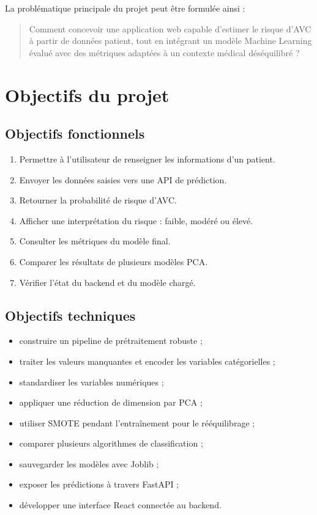 \documentclass[12pt,a4paper]{report}
\begin{document}
La problématique principale du projet peut être formulée ainsi :

\begin{quote}
Comment concevoir une application web capable d'estimer le risque d'AVC à partir de données patient, tout en intégrant un modèle Machine Learning évalué avec des métriques adaptées à un contexte médical déséquilibré ?
\end{quote}

\section{Objectifs du projet}

\subsection{Objectifs fonctionnels}
\begin{enumerate}
  \item Permettre à l'utilisateur de renseigner les informations d'un patient.
  \item Envoyer les données saisies vers une API de prédiction.
  \item Retourner la probabilité de risque d'AVC.
  \item Afficher une interprétation du risque : faible, modéré ou élevé.
  \item Consulter les métriques du modèle final.
  \item Comparer les résultats de plusieurs modèles PCA.
  \item Vérifier l'état du backend et du modèle chargé.
\end{enumerate}

\subsection{Objectifs techniques}
\begin{itemize}[label=--]
  \item construire un pipeline de prétraitement robuste ;
  \item traiter les valeurs manquantes et encoder les variables catégorielles ;
  \item standardiser les variables numériques ;
  \item appliquer une réduction de dimension par PCA ;
  \item utiliser SMOTE pendant l'entraînement pour le rééquilibrage ;
  \item comparer plusieurs algorithmes de classification ;
  \item sauvegarder les modèles avec Joblib ;
  \item exposer les prédictions à travers FastAPI ;
  \item développer une interface React connectée au backend.
\end{itemize}
\end{document}
